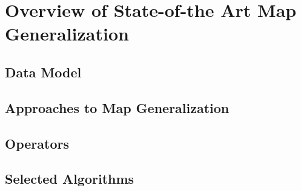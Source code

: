 \chapter{Overview of State-of-the Art Map Generalization}


\section{Data Model}

\section{Approaches to Map Generalization}

\section{Operators}


\section{Selected Algorithms}

